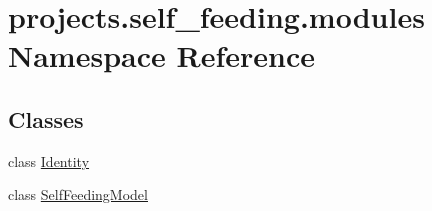 \hypertarget{namespaceprojects_1_1self__feeding_1_1modules}{}\section{projects.\+self\+\_\+feeding.\+modules Namespace Reference}
\label{namespaceprojects_1_1self__feeding_1_1modules}
\subsection*{Classes}
\begin{DoxyCompactItemize}
\item 
class \hyperlink{classprojects_1_1self__feeding_1_1modules_1_1Identity}{Identity}
\item 
class \hyperlink{classprojects_1_1self__feeding_1_1modules_1_1SelfFeedingModel}{Self\+Feeding\+Model}
\end{DoxyCompactItemize}
